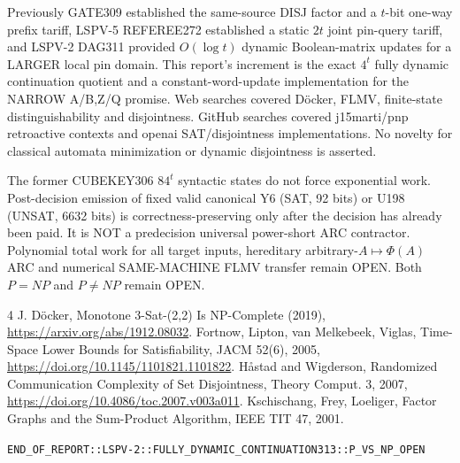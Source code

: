 \documentclass[11pt]{article}
\begin{document}
Previously GATE309 established the same-source DISJ factor and a $t$-bit one-way prefix tariff, LSPV-5 REFEREE272 established a static $2t$ joint pin-query tariff, and LSPV-2 DAG311 provided $O(\log t)$ dynamic Boolean-matrix updates for a LARGER local pin domain. This report's increment is the exact $4^t$ fully dynamic continuation quotient and a constant-word-update implementation for the NARROW A/B,Z/Q promise. Web searches covered D\"ocker, FLMV, finite-state distinguishability and disjointness. GitHub searches covered j15marti/pnp retroactive contexts and openai SAT/disjointness implementations. No novelty for classical automata minimization or dynamic disjointness is asserted.

The former CUBEKEY306 $84^t$ syntactic states do not force exponential work. Post-decision emission of fixed valid canonical Y6 (SAT, 92 bits) or U198 (UNSAT, 6632 bits) is correctness-preserving only after the decision has already been paid. It is NOT a predecision universal power-short ARC contractor. Polynomial total work for all target inputs, hereditary arbitrary-$A\mapsto\Phi(A)$ ARC and numerical SAME-MACHINE FLMV transfer remain OPEN. Both $P=NP$ and $P\ne NP$ remain OPEN.
\begin{thebibliography}{4}
 J. D\"ocker, Monotone 3-Sat-(2,2) Is NP-Complete (2019), \url{https://arxiv.org/abs/1912.08032}.
 Fortnow, Lipton, van Melkebeek, Viglas, Time-Space Lower Bounds for Satisfiability, JACM 52(6), 2005, \url{https://doi.org/10.1145/1101821.1101822}.
 H\aa stad and Wigderson, Randomized Communication Complexity of Set Disjointness, Theory Comput. 3, 2007, \url{https://doi.org/10.4086/toc.2007.v003a011}.
 Kschischang, Frey, Loeliger, Factor Graphs and the Sum-Product Algorithm, IEEE TIT 47, 2001.
\end{thebibliography}
\noindent\texttt{END\_OF\_REPORT::LSPV-2::FULLY\_DYNAMIC\_CONTINUATION313::P\_VS\_NP\_OPEN}
\end{document}
